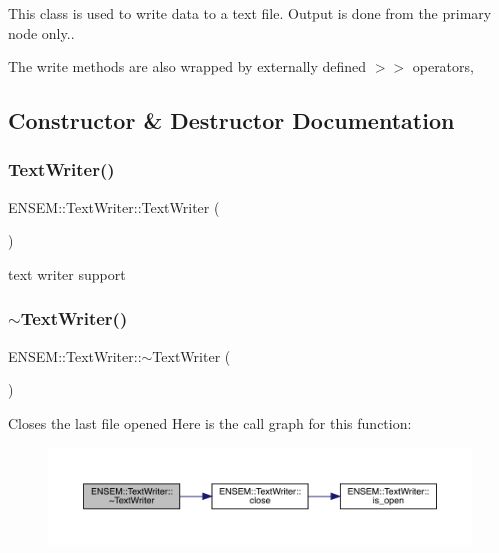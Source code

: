 This class is used to write data to a text file. Output is done from the primary node only..

The write methods are also wrapped by externally defined $>$$>$ operators, 

\subsection{Constructor \& Destructor Documentation}
\mbox{\label{classENSEM_1_1TextWriter_ad0b4ad57a3e91011920a473244447cac}} 
\subsubsection{\texorpdfstring{TextWriter()}{TextWriter()}\hspace{0.1cm}{\footnotesize\ttfamily [1/6]}}
{\footnotesize\ttfamily E\+N\+S\+E\+M\+::\+Text\+Writer\+::\+Text\+Writer (\begin{DoxyParamCaption}{ }\end{DoxyParamCaption})}



text writer support 

\mbox{\label{classENSEM_1_1TextWriter_a2aa3ba4260c005b4a2910046448cc193}} 
\subsubsection{\texorpdfstring{$\sim$TextWriter()}{~TextWriter()}\hspace{0.1cm}{\footnotesize\ttfamily [1/3]}}
{\footnotesize\ttfamily E\+N\+S\+E\+M\+::\+Text\+Writer\+::$\sim$\+Text\+Writer (\begin{DoxyParamCaption}{ }\end{DoxyParamCaption})}

Closes the last file opened Here is the call graph for this function\+:\nopagebreak
\begin{figure}[H]
\begin{center}
\leavevmode
\includegraphics[width=350pt]{db/d53/classENSEM_1_1TextWriter_a2aa3ba4260c005b4a2910046448cc193_cgraph}
\end{center}
\end{figure}
\mbox{\label{classENSEM_1_1TextWriter_abbaa16dfaccb062fc8cea4ce2abf3215}} 
